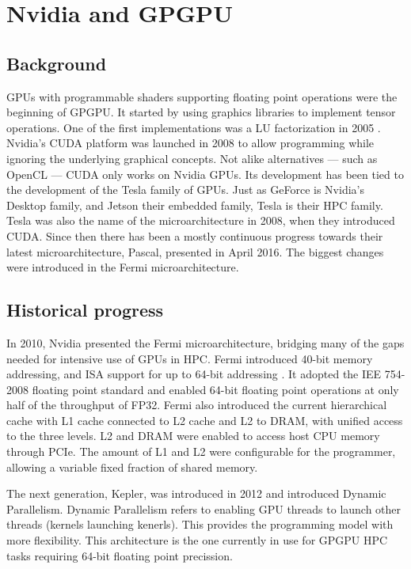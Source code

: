 
\section{Nvidia and GPGPU}

\subsection{Background}
GPUs with programmable shaders supporting floating point operations were the beginning of GPGPU.
It started by using graphics libraries to implement tensor operations.
One of the first implementations was a LU factorization in 2005 \cite{du2012cuda}.
Nvidia's CUDA platform was launched in 2008 to allow programming while ignoring the underlying graphical concepts.
Not alike alternatives --- such as OpenCL --- CUDA only works on Nvidia GPUs.
Its development has been tied to the development of the Tesla family of GPUs.
Just as GeForce is Nvidia's Desktop family, and Jetson their embedded family, Tesla is their HPC family.
Tesla was also the name of the microarchitecture in 2008, when they introduced CUDA.
Since then there has been a mostly continuous progress towards their latest microarchitecture, Pascal, presented in April 2016.
The biggest changes were introduced in the Fermi microarchitecture.

\subsection{Historical progress}
In 2010, Nvidia presented the Fermi microarchitecture, bridging many of the gaps needed for intensive use of GPUs in HPC.
Fermi introduced 40-bit memory addressing, and ISA support for up to 64-bit addressing \cite{nickolls2010gpu}.
It adopted the IEE 754-2008 floating point standard and enabled 64-bit floating point operations at only half of the throughput of FP32.
Fermi also introduced the current hierarchical cache with L1 cache connected to L2 cache and L2 to DRAM, with unified access to the three levels.
L2 and DRAM were enabled to access host CPU memory through PCIe.
The amount of L1 and L2 were configurable for the programmer, allowing a variable fixed fraction of shared memory.

The next generation, Kepler, was introduced in 2012 and introduced Dynamic Parallelism.
Dynamic Parallelism refers to enabling GPU threads to launch other threads (kernels launching kenerls).
This provides the programming model with more flexibility.
This architecture is the one currently in use for GPGPU HPC tasks requiring 64-bit floating point precission.

